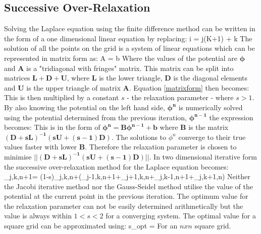 \subsection{Successive Over-Relaxation}
Solving the Laplace equation using the finite difference method can be written in the form of a one dimensional linear equation by replacing:
\be
i = j(K+1) + k
\ee
The solution of all the points on the grid is a system of linear equations which can be represented in matrix form as:
\be
\label{matrixform}
\boldmath A \cdot \phi = b
\ee
Where the values of the potential are $\boldsymbol{\phi}$ and $\boldsymbol{A}$ is a "tridiagonal with fringes" matrix. This matrix can be split into matrices $\boldsymbol{L + D + U}$, where $\boldsymbol{L}$ is the lower triangle, $\boldsymbol{D}$ is the diagonal elements  and $\boldsymbol{U}$ is the upper triangle of matrix $\boldsymbol{A}$. Equation \ref{matrixform} then becomes:
\be
{}
\ee
This is then multiplied by a constant $s$ - the relaxation parameter - where $s > 1$. By also knowing  the potential on the left hand side, $\boldsymbol{\phi^{n}}$ is numerically solved using the potential determined from the previous iteration, $\boldsymbol{\phi^{n-1}}$ the expression becomes:
\be
{}
\ee
This is in the form of $\boldsymbol{\phi^{n} = B\phi^{n-1} + b}$ where $\boldsymbol{B}$ is the matrix $\boldsymbol{(D + sL)^{-1}(sU + (s-1)D)}$. The solutions to $\phi^{n}$ converge to their true values faster with lower $\boldsymbol{B}$. Therefore the relaxation parameter is chosen to minimise $\boldsymbol{||(D + sL)^{-1}(sU + (s-1)D)}||$. In two dimensional iterative form the successive over-relaxation method for the Laplace equation becomes:
\be
\phi_{j,k,n+1}= (1-s)\phi_{j,k,n}+(\phi_{j-1,k,n+1}+\phi_{j+1,k,n}+\phi_{j,k-1,n+1}+\phi_{j,k+1,n})
\ee
Neither the Jacobi iterative method nor the Gauss-Seidel method utilise the value
of the potential at the current point in the previous iteration. The optimum value for the relaxation parameter can not be easily determined arithmetically but the value is always within $1<s<2$ for a converging system. The optimal value for a square grid can be approximated using:
 \be
 s_{opt} =  \approx {}
 \ee
For an $n x n$ square grid.
